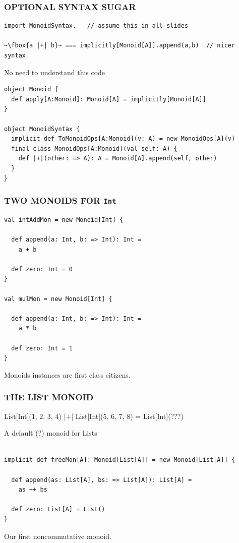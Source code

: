 \documentclass{beamer}
\begin{document}
\begin{frame}[fragile]\frametitle{OPTIONAL SYNTAX SUGAR}
  \begin{block}{}
  \begin{lstlisting}
import MonoidSyntax._  // assume this in all slides

~\fbox{a |+| b}~ === implicitly[Monoid[A]].append(a,b)  // nicer syntax
  \end{lstlisting}
  \end{block}

  \begin{block}{No need to understand this code}
  \begin{lstlisting}
object Monoid {
  def apply[A:Monoid]: Monoid[A] = implicitly[Monoid[A]]
}

object MonoidSyntax {
  implicit def ToMonoidOps[A:Monoid](v: A) = new MonoidOps[A](v)
  final class MonoidOps[A:Monoid](val self: A) {
    def |+|(other: => A): A = Monoid[A].append(self, other)
  }
}
  \end{lstlisting}
  \end{block}
\end{frame}

\begin{frame}[fragile]\frametitle{TWO MONOIDS FOR \texttt{Int}}
  \begin{block}{}
  \begin{lstlisting}
val intAddMon = new Monoid[Int] {

  def append(a: Int, b: => Int): Int =
    a + b

  def zero: Int = 0
}

val mulMon = new Monoid[Int] {

  def append(a: Int, b: => Int): Int =
    a * b

  def zero: Int = 1
}
  \end{lstlisting}
  \end{block}
  Monoids \alert{instances} are first class citizens.
\end{frame}

\begin{frame}[fragile]\frametitle{THE LIST MONOID}
  \begin{block}{}
    List[Int](1, 2, 3, 4) |+| List[Int](5, 6, 7, 8) = List[Int](???)
  \end{block}

  \pause

  \begin{block}{A default (?) monoid for Lists}
  \begin{lstlisting}

implicit def freeMon[A]: Monoid[List[A]] = new Monoid[List[A]] {

  def append(as: List[A], bs: => List[A]): List[A] =
    as ++ bs

  def zero: List[A] = List()
}
  \end{lstlisting}
  \end{block}
  Our first noncommutative monoid.
\end{frame}
\end{document}
